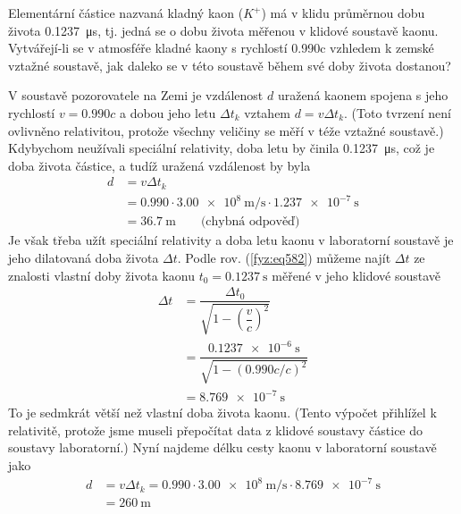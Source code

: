 \begin{mdframed}[style=mdexam]
  \begin{example}\label{fyz:fey_exam022}
    Elementární částice nazvaná kladný kaon (\(K^+\)) má v klidu průměrnou dobu života
    \SI{0.1237}{\micro\s}, tj. jedná se o dobu života měřenou v klidové soustavě kaonu. Vytvářejí-li
    se v atmosféře kladné kaony s rychlostí \num{0.990}c vzhledem k zemské vztažné soustavě, jak
    daleko se v této soustavě během své doby života dostanou?

    \vspace{1em}
    V soustavě pozorovatele na Zemi je vzdálenost \(d\) uražená kaonem spojena s jeho rychlostí \(v
    = \num{0.990}c\) a dobou jeho letu \(\Delta t_k\) vztahem \(d = v\Delta t_k\). (Toto tvrzení
    není ovlivněno relativitou, protože všechny veličiny se měří v téže vztažné soustavě.) Kdybychom
    neužívali speciální relativity, doba letu by činila \SI{0.1237}{\micro\s}, což je doba života
    částice, a tudíž uražená vzdálenost by byla
    \begin{align*}
      d &= v\Delta t_k                                                        \\
        &= \num{0.990}\cdot\SI{3.00e8}{\m\per\s}\cdot\SI{1.237e-7}{\s}        \\
        &= \SI{36.7}{\m}  \qquad\text{(chybná odpověď)} 
    \end{align*}  
    Je však třeba užít speciální relativity a doba letu kaonu v laboratorní soustavě je jeho
    dilatovaná doba života \(\Delta t\). Podle rov. (\ref{fyz:eq582}) můžeme najít \(\Delta t\) ze
    znalosti vlastní doby života kaonu \(t_0 = \SI{0.1237}{\s}\) měřené v jeho klidové soustavě
    \begin{align*}
      \Delta t &= \dfrac{\Delta t_0}{\sqrt{1  - \left(\dfrac{v}{c}\right)^2}}   \\
               &= \dfrac{\SI{0.123 7e-6}{\s}}{\sqrt{1  - (\num{0.990}c/c)^2}}  \\
               &= \SI{8.769e-7}{\s}
    \end{align*}
    To je sedmkrát větší než vlastní doba života kaonu. (Tento výpočet přihlížel k relativitě,
    protože jsme museli přepočítat data z klidové soustavy částice do soustavy laboratorní.) Nyní
    najdeme délku cesty kaonu v laboratorní soustavě jako
    \begin{align*}
      d &= v\Delta t_k                                                      
        = \num{0.990}\cdot\SI{3.00e8}{\m\per\s}\cdot\SI{8.769e-7}{\s}        \\
        &= \SI{260}{\m}  
    \end{align*} 


\end{example}
\end{mdframed}
